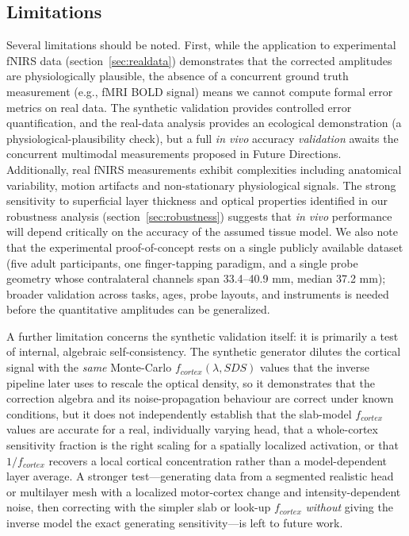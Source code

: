 \documentclass[11pt]{article}
\def\mathrm#1{#1}%
\def\,{ }%
\begin{document}
\subsection{Limitations}

Several limitations should be noted. First, while the application to experimental fNIRS data (section~\ref{sec:realdata}) demonstrates that the corrected amplitudes are physiologically plausible, the absence of a concurrent ground truth measurement (e.g., fMRI BOLD signal) means we cannot compute formal error metrics on real data. The synthetic validation provides controlled error quantification, and the real-data analysis provides an ecological demonstration (a physiological-plausibility check), but a full \textit{in vivo} accuracy \emph{validation} awaits the concurrent multimodal measurements proposed in Future Directions. Additionally, real fNIRS measurements exhibit complexities including anatomical variability, motion artifacts and non-stationary physiological signals. The strong sensitivity to superficial layer thickness and optical properties identified in our robustness analysis (section~\ref{sec:robustness}) suggests that \textit{in vivo} performance will depend critically on the accuracy of the assumed tissue model. We also note that the experimental proof-of-concept rests on a single publicly available dataset (five adult participants, one finger-tapping paradigm, and a single probe geometry whose contralateral channels span 33.4--40.9\,mm, median 37.2\,mm); broader validation across tasks, ages, probe layouts, and instruments is needed before the quantitative amplitudes can be generalized.

A further limitation concerns the synthetic validation itself: it is primarily a test of internal, algebraic self-consistency. The synthetic generator dilutes the cortical signal with the \emph{same} Monte-Carlo $f_{\mathrm{cortex}}(\lambda,\mathrm{SDS})$ values that the inverse pipeline later uses to rescale the optical density, so it demonstrates that the correction algebra and its noise-propagation behaviour are correct under known conditions, but it does not independently establish that the slab-model $f_{\mathrm{cortex}}$ values are accurate for a real, individually varying head, that a whole-cortex sensitivity fraction is the right scaling for a spatially localized activation, or that $1/f_{\mathrm{cortex}}$ recovers a local cortical concentration rather than a model-dependent layer average. A stronger test---generating data from a segmented realistic head or multilayer mesh with a localized motor-cortex change and intensity-dependent noise, then correcting with the simpler slab or look-up $f_{\mathrm{cortex}}$ \emph{without} giving the inverse model the exact generating sensitivity---is left to future work.
\end{document}
